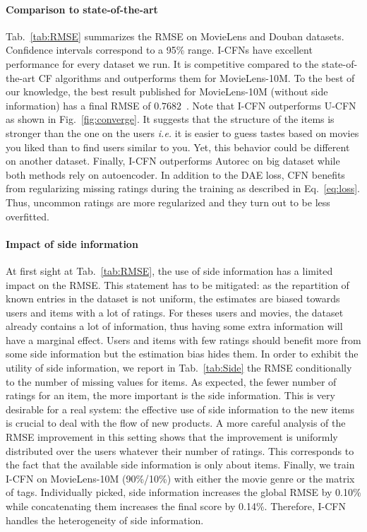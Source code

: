 \documentclass{article}
\begin{document}
\paragraph{Comparison to state-of-the-art}
Tab.~\ref{tab:RMSE} summarizes the RMSE on MovieLens and Douban datasets. Confidence intervals correspond to a 95\% range. I-CFNs have excellent performance for every dataset we run. It is competitive compared to the state-of-the-art CF algorithms and outperforms them for MovieLens-10M. To the best of our knowledge, the best result published for MovieLens-10M (without side information) has a final RMSE of $0.7682$~\cite{Li2016}. Note that I-CFN outperforms U-CFN as shown in Fig.~\ref{fig:converge}. It suggests that the structure of the items is stronger than the one on the users \textit{i.e.} it is easier to guess tastes based on movies you liked than to find users similar to you. Yet, this behavior could be different on another dataset. Finally, I-CFN outperforms Autorec on big dataset while both methods rely on autoencoder. In addition to the DAE loss, CFN benefits from regularizing missing ratings during the training as described in Eq.~\ref{eq:loss}. Thus, uncommon ratings are more regularized and they turn out to be less overfitted.
\vspace{-0.5em}
\paragraph{Impact of side information}
At first sight at Tab.~\ref{tab:RMSE}, the use of side information has a limited impact on the RMSE. This statement has to be mitigated: as the repartition of known entries in the dataset is not uniform, the estimates are biased towards users and items with a lot of ratings. For theses users and movies, the dataset already contains a lot of information, thus having some extra information will have a marginal effect. Users and items with few ratings should benefit more from some side information but the estimation bias hides them. 
In order to exhibit the utility of side information, we report in Tab.~\ref{tab:Side} the RMSE conditionally to the number of missing values for items. As expected, the fewer number of ratings for an item, the more important is the side information. This is very desirable for a real system: the effective use of side information to the new items is crucial to deal with the flow of new products. A more careful analysis of the RMSE improvement in this setting shows that the improvement is uniformly distributed over the users whatever their number of ratings. This corresponds to the fact that the available side information is only about items. Finally, we train I-CFN on MovieLens-10M (90\%/10\%) with either the movie genre or the matrix of tags. Individually picked, side information increases the global RMSE by 0.10\% while concatenating them increases the final score by 0.14\%. Therefore, I-CFN handles the heterogeneity of side information.
\end{document}
